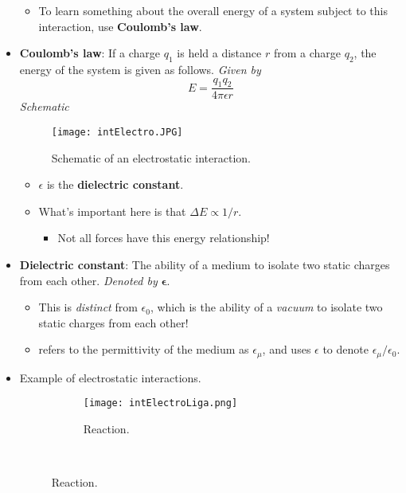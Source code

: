 \documentclass[../notes.tex]{subfiles}
\begin{document}
\begin{itemize}
\begin{itemize}
        \item To learn something about the overall energy of a system subject to this interaction, use \textbf{Coulomb's law}.
    \end{itemize}
    \item \textbf{Coulomb's law}: If a charge $q_1$ is held a distance $r$ from a charge $q_2$, the energy of the system is given as follows. \emph{Given by}
    \begin{equation*}
        E = \frac{q_1q_2}{4\pi\epsilon r}
    \end{equation*}
    \emph{Schematic}
    \begin{figure}[h!]
        \centering
        \texttt{[image: intElectro.JPG]}
        \caption{Schematic of an electrostatic interaction.}
        \label{fig:intElectro}
    \end{figure}
    \begin{itemize}
        \item $\epsilon$ is the \textbf{dielectric constant}.
        \item What's important here is that $\Delta E\propto 1/r$.
        \begin{itemize}
            \item Not all forces have this energy relationship!
        \end{itemize}
    \end{itemize}
    \item \textbf{Dielectric constant}: The ability of a medium to isolate two static charges from each other. \emph{Denoted by} $\bm{\epsilon}$.
    \begin{itemize}
        \item This is \emph{distinct} from $\epsilon_0$, which is the ability of a \emph{vacuum} to isolate two static charges from each other!
        \item \textcite{bib:Anslyn} refers to the permittivity of the medium as $\epsilon_\mu$, and uses $\epsilon$ to denote $\epsilon_\mu/\epsilon_0$.
    \end{itemize}
    \item Example of electrostatic interactions.
    \begin{figure}[H]
        \centering
        \footnotesize
        \begin{subfigure}[b]{\linewidth}
            \centering
            \texttt{[image: intElectroLiga.png]}
            \caption{Reaction.}
            \label{fig:intElectroLiga}
        \end{subfigure}\\[2em]

\end{figure}
\end{itemize}
\end{document}
